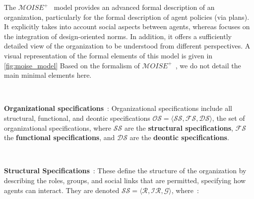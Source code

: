         The $\mathcal{M}OISE^+$~\citep{Hubner2002} model provides an advanced formal description of an organization, particularly for the formal description of agent policies (via plans). It explicitly takes into account social aspects between agents, whereas  focuses on the integration of design-oriented norms. In addition, it offers a sufficiently detailed view of the organization to be understood from different perspectives. A visual representation of the formal elements of this model is given in \autoref{fig:moise_model}
        Based on the formalism of $\mathcal{M}OISE^+$~\citep{hubner2007moise}, we do not detail the main minimal elements here.

        \

        \noindent \textbf {Organizational specifications}~: Organizational specifications include all structural, functional, and deontic specifications \quad $\mathcal{OS} = \langle \mathcal{SS}, \mathcal{FS}, \mathcal{DS} \rangle$, the set of organizational specifications, where $\mathcal{SS}$ are the \textbf{structural specifications}, $\mathcal{FS}$ the \textbf {functional specifications}, and $\mathcal{DS}$ are the \textbf{deontic specifications}.

        \

        \noindent \textbf{Structural Specifications}~: These define the structure of the organization by describing the roles, groups, and social links that are permitted, specifying how agents can interact. They are denoted \quad $\mathcal{SS} = \langle \mathcal{R}, \mathcal{IR}, \mathcal{G} \rangle$, where~:

